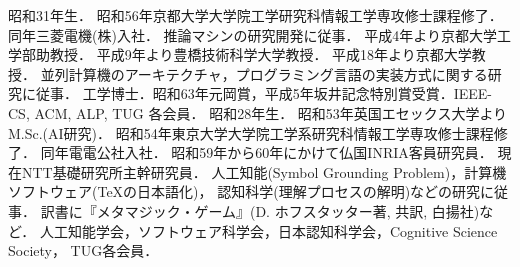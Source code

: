 \begin{biography}
昭和31年生．
昭和56年京都大学大学院工学研究科情報工学専攻修士課程修了．
同年三菱電機(株)入社．
推論マシンの研究開発に従事．
平成4年より京都大学工学部助教授．
平成9年より豊橋技術科学大学教授．
平成18年より京都大学教授．
並列計算機のアーキテクチャ，プログラミング言語の実装方式に関する研究に従事．
工学博士．昭和63年元岡賞，平成5年坂井記念特別賞受賞．IEEE-CS, ACM, ALP, TUG
各会員．
%
昭和28年生．
昭和53年英国エセックス大学よりM.Sc.(AI研究)．
昭和54年東京大学大学院工学系研究科情報工学専攻修士課程修了．
同年電電公社入社．
昭和59年から60年にかけて仏国INRIA客員研究員．
現在NTT基礎研究所主幹研究員．
人工知能(Symbol Grounding Problem)，計算機ソフトウェア(\TeX の日本語化)，
認知科学(理解プロセスの解明)などの研究に従事．
訳書に『メタマジック・ゲーム』(D. ホフスタッター著, 共訳, 白揚社)など．
人工知能学会，ソフトウェア科学会，日本認知科学会，Cognitive Science Society，
TUG各会員．
\end{biography}